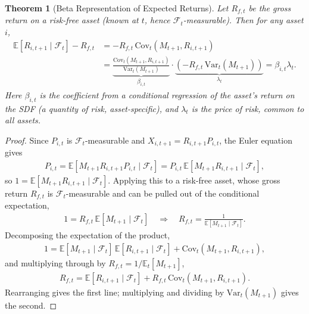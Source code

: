 \documentclass[11pt]{article}
\theoremstyle{definition}
\theoremstyle{plain}
\newtheorem{theorem}{Theorem}[section]
\theoremstyle{remark}
\begin{document}
\begin{theorem}[Beta Representation of Expected Returns]\label{thm:beta-rep}
    Let $R_{f,t}$ be the gross return on a risk-free asset (known at $t$, hence $\mathcal{F}_t$-measurable). Then for any asset $i$,
    \begin{align}
        \mathbb{E}[R_{i,t+1}\mid\mathcal{F}_t] - R_{f,t}
        &= -R_{f,t}\,\mathrm{Cov}_t(M_{t+1}, R_{i,t+1}) \\
        &= \underbrace{\frac{\mathrm{Cov}_t(M_{t+1},R_{i,t+1})}{\mathrm{Var}_t(M_{t+1})}}_{\textstyle \beta_{i,t}}
           \cdot
           \underbrace{\left(-R_{f,t}\,\mathrm{Var}_t(M_{t+1})\right)}_{\textstyle \lambda_t}
        = \beta_{i,t}\lambda_t.
    \end{align}
    Here $\beta_{i,t}$ is the coefficient from a conditional regression of the asset's return on the SDF (a \emph{quantity} of risk, asset-specific), and $\lambda_t$ is the \emph{price} of risk, common to all assets.
\end{theorem}
\begin{proof}
    Since $P_{i,t}$ is $\mathcal{F}_t$-measurable and $X_{i,t+1} = R_{i,t+1}P_{i,t}$, the Euler equation gives
    \begin{align}
        P_{i,t} = \mathbb{E}[M_{t+1}R_{i,t+1}P_{i,t}\mid\mathcal{F}_t] = P_{i,t}\,\mathbb{E}[M_{t+1}R_{i,t+1}\mid\mathcal{F}_t],
    \end{align}
    so $1 = \mathbb{E}[M_{t+1}R_{i,t+1}\mid\mathcal{F}_t]$. Applying this to a risk-free asset, whose gross return $R_{f,t}$ is $\mathcal{F}_t$-measurable and can be pulled out of the conditional expectation,
    \begin{align}
        1 = R_{f,t}\,\mathbb{E}[M_{t+1}\mid\mathcal{F}_t]
        \quad\Longrightarrow\quad
        R_{f,t} = \frac{1}{\mathbb{E}[M_{t+1}\mid\mathcal{F}_t]}.
    \end{align}
    Decomposing the expectation of the product,
    \begin{align}
        1 = \mathbb{E}[M_{t+1}\mid\mathcal{F}_t]\,\mathbb{E}[R_{i,t+1}\mid\mathcal{F}_t] + \mathrm{Cov}_t(M_{t+1},R_{i,t+1}),
    \end{align}
    and multiplying through by $R_{f,t} = 1/\mathbb{E}_t[M_{t+1}]$,
    \begin{align}
        R_{f,t} = \mathbb{E}[R_{i,t+1}\mid\mathcal{F}_t] + R_{f,t}\,\mathrm{Cov}_t(M_{t+1},R_{i,t+1}).
    \end{align}
    Rearranging gives the first line; multiplying and dividing by $\mathrm{Var}_t(M_{t+1})$ gives the second.
\end{proof}
\end{document}
